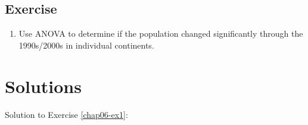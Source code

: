 \documentclass[
  12pt,
  krantz2]{krantz}
\providecommand{\tightlist}{%
  \setlength{\itemsep}{0pt}\setlength{\parskip}{0pt}}
\begin{document}
\hypertarget{chap06-ex4}{%
\subsection{Exercise}\label{chap06-ex4}}

\begin{enumerate}
\def\labelenumi{\arabic{enumi}.}
\tightlist
\item
  Use ANOVA to determine if the population changed significantly through the 1990s/2000s in individual continents.
\end{enumerate}

\hypertarget{solutions-1}{%
\section{Solutions}\label{solutions-1}}

Solution to Exercise \ref{chap06-ex1}:
\end{document}
